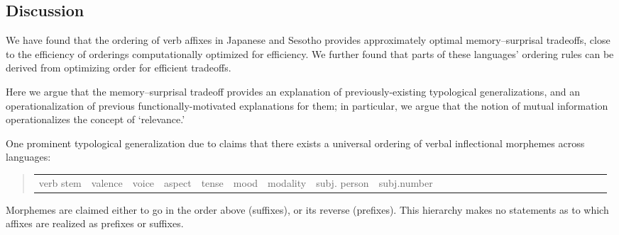 









\subsection{Discussion}
We have found that the ordering of verb affixes in Japanese and Sesotho provides approximately optimal memory--surprisal tradeoffs, close to the efficiency of orderings computationally optimized for efficiency.
We further found that parts of these languages' ordering rules can be derived from optimizing order for efficient tradeoffs.

Here we argue that the memory--surprisal tradeoff provides an explanation of previously-existing typological generalizations, and an operationalization of previous functionally-motivated explanations for them; in particular, we argue that the notion of mutual information operationalizes the concept of `relevance.'

One prominent typological generalization due to \citet{bybee-morphology-1985} claims that there exists a universal ordering of verbal inflectional morphemes across languages:
\begin{quote}
\begin{tabular}{llllllllllllllllllllllllll}
verb stem & valence & voice & aspect & tense& mood & modality & subj. person & subj.number 
\end{tabular}
\end{quote}
Morphemes are claimed either to go in the order above (suffixes), or its reverse (prefixes). This hierarchy makes no statements as to which affixes are realized as prefixes or suffixes.

